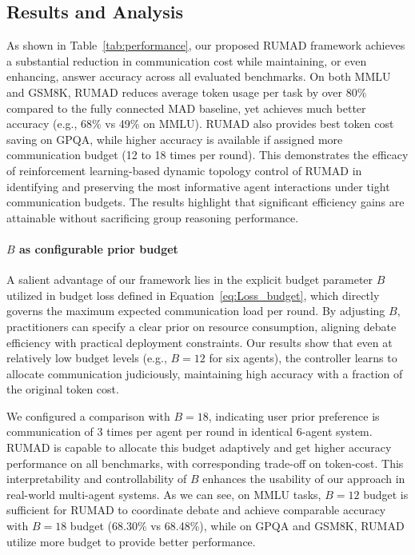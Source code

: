 \subsection{Results and Analysis}
\label{sec:main_result}
As shown in Table~\ref{tab:performance}, our proposed RUMAD framework achieves a substantial reduction in communication cost while maintaining, or even enhancing, answer accuracy across all evaluated benchmarks. On both MMLU and GSM8K, RUMAD reduces average token usage per task by over 80\% compared to the fully connected MAD baseline, yet achieves much better accuracy (e.g., 68\% vs 49\% on MMLU). RUMAD also provides best token cost saving on GPQA, while higher accuracy is available if assigned more communication budget (12 to 18 times per round). This demonstrates the efficacy of reinforcement learning-based dynamic topology control of RUMAD in identifying and preserving the most informative agent interactions under tight communication budgets. The results highlight that significant efficiency gains are attainable without sacrificing group reasoning performance.

\paragraph{\textbf{$B$ as configurable prior budget}} A salient advantage of our framework lies in the explicit budget parameter $B$ utilized in budget loss defined in Equation~\ref{eq:Loss_budget}, which directly governs the maximum expected communication load per round. By adjusting $B$, practitioners can specify a clear prior on resource consumption, aligning debate efficiency with practical deployment constraints. Our results show that even at relatively low budget levels (e.g., $B=12$ for six agents), the controller learns to allocate communication judiciously, maintaining high accuracy with a fraction of the original token cost.

We configured a comparison with $B=18$, indicating user prior preference is communication of 3 times per agent per round in identical 6-agent system. RUMAD is capable to allocate this budget adaptively and get higher accuracy performance on all benchmarks, with corresponding trade-off on token-cost. This interpretability and controllability of $B$ enhances the usability of our approach in real-world multi-agent systems. As we can see, on MMLU tasks, $B=12$ budget is sufficient for RUMAD to coordinate debate and achieve comparable accuracy with $B=18$ budget (68.30\% vs 68.48\%), while on GPQA and GSM8K, RUMAD utilize more budget to provide better performance.

